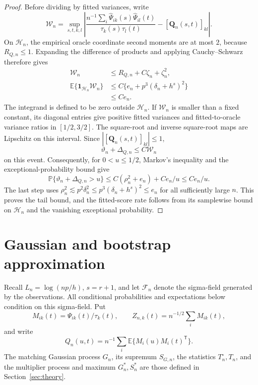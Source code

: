 \documentclass[12pt]{article}
\newcommand{\bQ}{{\mathbf Q}}
\newcommand{\expect}{\mathbb{E}}
\newcommand{\prob}{\mathbb{P}}
\newcommand{\trans}{{\scriptscriptstyle\mathsf{T}}}
\numberwithin{equation}{section}
\begin{document}
\begin{proof}
Before dividing by fitted variances, write
\[
\mathcal W_n=\sup_{s,t,k,l}
\left|\frac{n^{-1}\sum_i
\widehat\Psi_{ik}(s)\widehat\Psi_{il}(t)}
{\tau_k(s)\tau_l(t)}-[\bQ_n(s,t)]_{kl}\right|.
\]
On $\mathcal H_n$, the empirical oracle coordinate second moments
are at most $2$, because $R_{Q,n}\le1$.  Expanding the difference
of products and applying Cauchy--Schwarz therefore gives
\[
\begin{aligned}
\mathcal W_n&\le R_{Q,n}+C\zeta_n+\zeta_n^2,\\
\expect\{\mathbf1_{\mathcal H_n}\mathcal W_n\}
&\le C\{e_n+p^3(\delta_n+h^s)^2\}\\
&\le Ce_n.
\end{aligned}
\]
The integrand is defined to be zero outside $\mathcal H_n$.
If $\mathcal W_n$ is smaller than a fixed constant, its diagonal
entries give positive fitted variances and fitted-to-oracle variance
ratios in $[1/2,3/2]$.  The square-root and inverse square-root maps
are Lipschitz on this interval.  Since $|[\bQ_n(s,t)]_{kl}|\le1$,
\[
\vartheta_n+\Delta_{Q,n}\le C\mathcal W_n
\]
on this event.  Consequently, for $0<u\le1/2$, Markov's inequality
and the exceptional-probability bound give
\[
\prob\{\vartheta_n+\Delta_{Q,n}>u\}
\le C(\rho_n^2+e_n)+Ce_n/u\le Ce_n/u.
\]
The last step uses $\rho_n^2\lesssim p^2\delta_n^2
\le p^3(\delta_n+h^s)^2\le e_n$ for all sufficiently large $n$.
This proves the tail bound, and the
fitted-score rate follows from its samplewise bound on
$\mathcal H_n$ and the vanishing exceptional probability.
\end{proof}

\section{Gaussian and bootstrap approximation}
\label{app:hd-approximation}\label{app:approximation-proofs}

Recall $L_n=\log(np/h)$, $s=r+1$, and let $\mathcal F_n$ denote the
sigma-field generated by the observations. All conditional probabilities
and expectations below condition on this sigma-field. Put
\[
 M_{ik}(t)=\Psi_{ik}(t)/\tau_k(t),\qquad
 Z_{n,k}(t)=n^{-1/2}\sum_i M_{ik}(t),
\]
and write
\[
Q_n(u,t)=n^{-1}\sum_i\expect\{M_i(u)M_i(t)^\trans\}.
\]
The matching Gaussian process $G_n$, its supremum $S_{G,n}$, the
statistics $T_n^\circ,T_n$, and the multiplier process and maximum
$G_n^*,S_n^*$ are those defined in Section~\ref{sec:theory}.
\end{document}
